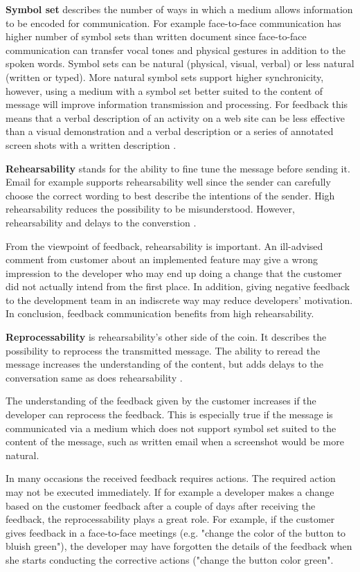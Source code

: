 \documentclass[english,12pt,a4paper,pdftex]{article}
\begin{document}
\textbf{Symbol set} describes the number of ways in which a medium allows information to be encoded for communication. For example face-to-face communication has higher number of symbol sets than written document since face-to-face communication can transfer vocal tones and physical gestures in addition to the spoken words. Symbol sets can be natural (physical, visual, verbal) or less natural (written or typed). More natural symbol sets support higher synchronicity, however, using a medium with a symbol set better suited to the content of message will improve information transmission and processing. For feedback this means that a verbal description of an activity on a web site can be less effective than a visual demonstration and a verbal description or a series of annotated screen shots with a written description \citep{dennis1999}.

\textbf{Rehearsability} stands for the ability to fine tune the message before sending it. Email for example supports rehearsability well since the sender can carefully choose the correct wording to best describe the intentions of the sender. High rehearsability reduces the possibility to be misunderstood. However, rehearsability and delays to the converstion \citep{dennis1999}.

From the viewpoint of feedback, rehearsability is important. An ill-advised comment from customer about an implemented feature may give a wrong impression to the developer who may end up doing a change that the customer did not actually intend from the first place. In addition, giving negative feedback to the development team in an indiscrete way may reduce developers' motivation. In conclusion, feedback communication benefits from high rehearsability.

\textbf{Reprocessability} is rehearsability's other side of the coin. It describes the possibility to reprocess the transmitted message. The ability to reread the message increases the understanding of the content, but adds delays to the conversation same as does rehearsability \citep{dennis1999}.

The understanding of the feedback given by the customer increases if the developer can reprocess the feedback. This is especially true if the message is communicated via a medium which does not support symbol set suited to the content of the message, such as written email when a screenshot would be more natural.

In many occasions the received feedback requires actions. The required action may not be executed immediately. If for example a developer makes a change based on the customer feedback after a couple of days after receiving the feedback, the reprocessability plays a great role. For example, if the customer gives feedback in a face-to-face meetings (e.g. "change the color of the button to bluish green"), the developer may have forgotten the details of the feedback when she starts conducting the corrective actions ("change the button color green".
\end{document}
